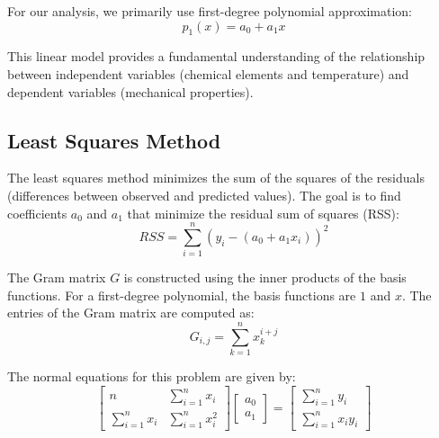 \documentclass[10pt]{article}
\begin{document}
For our analysis, we primarily use first-degree polynomial approximation:
\begin{equation}
p_1(x) = a_0 + a_1 x
\end{equation}

This linear model provides a fundamental understanding of the relationship between independent variables (chemical elements and temperature) and dependent variables (mechanical properties).

\subsection{Least Squares Method}

The least squares method minimizes the sum of the squares of the residuals (differences between observed and predicted values). The goal is to find coefficients \( a_0 \) and \( a_1 \) that minimize the residual sum of squares (RSS):
\begin{equation}
RSS = \sum_{i=1}^{n} \left( y_i - (a_0 + a_1 x_i) \right)^2
\end{equation}

The Gram matrix \( G \) is constructed using the inner products of the basis functions. For a first-degree polynomial, the basis functions are \( 1 \) and \( x \). The entries of the Gram matrix are computed as:
\begin{equation}
G_{i,j} = \sum_{k=1}^{n} x_k^{i+j}
\end{equation}


The normal equations for this problem are given by:
\begin{equation}
\begin{bmatrix}
n & \sum_{i=1}^{n} x_i \\
\sum_{i=1}^{n} x_i & \sum_{i=1}^{n} x_i^2
\end{bmatrix}
\begin{bmatrix}
a_0 \\
a_1
\end{bmatrix}
=
\begin{bmatrix}
\sum_{i=1}^{n} y_i \\
\sum_{i=1}^{n} x_i y_i
\end{bmatrix}
\end{equation}
\end{document}
